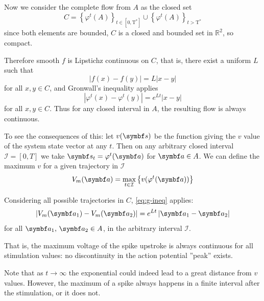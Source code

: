 Now we consider the complete flow from $A$ as the closed set
\begin{equation}
    C = \left\{\varphi^t(A)\right\}_{t \in [0, \mathrm{T}^*]} \cup \left\{\varphi^t(A)\right\}_{t>\mathrm{T}^*}
\end{equation}
since both elements are bounded, $C$ is a closed and bounded set in $\mathbb{R}^2$, so compact. 

Therefore smooth $f$ is Lipstichz continuous on $C$, that is, there exist a uniform $L$ such that
\begin{equation}
    \left|f(x) - f(y)\right| = L \left|x - y\right|
\end{equation}
for all $x, y \in C$, and Gronwall's inequality applies
\begin{equation}
    \label{eq:g-ineq}
    \left|\varphi^t(x) - \varphi^t(y)\right| = e^{Lt}\left|x - y\right|
\end{equation}
for all $x, y \in C$. 
Thus for any closed interval in $A$, the resulting flow is always continuous. 

To see the consequences of this: let $v(\vb{s})$ be the function giving the $v$ value of the system state vector at any $t$. 
Then on any arbitrary closed interval $\mathcal{I} = \left[0, T\right]$ we take $\vb{s}_t = \varphi^t(\vb{a})$ for $\vb{a} \in A$. 
We can define the maximum $v$ for a given trajectory in $\mathcal{I}$
\begin{equation}
    V_{m}(\vb{a}) = \max_{t \in \mathcal{I}} \left\{v(\varphi^t(\vb{a}))\right\}
\end{equation}

Considering all possible trajectories in $C$, \ref{eq:g-ineq} applies:
\begin{equation}
    \left|V_m(\vb{a}_1) - V_m(\vb{a}_2)\right| = e^{Lt}\left|\vb{a}_1 - \vb{a}_2\right|
\end{equation}
for all $\vb{a}_1 \text{, } \vb{a}_2 \in A$, in the arbitrary interval $\mathcal{I}$. 

That is, the maximum voltage of the spike upstroke is always continuous for all stimulation values: no discontinuity in the action potential ''peak'' exists.

Note that as $t \to \infty$ the exponential could indeed lead to a great distance from $v$ values. 
However, the maximum of a spike always happens in a finite interval after the stimulation, or it does not. 